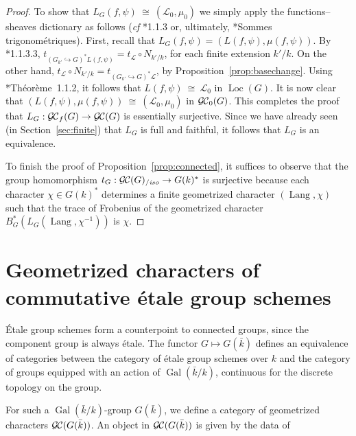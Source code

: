 \documentclass[11pt]{amsart}
\theoremstyle{plain}
\theoremstyle{definition}
\theoremstyle{remark}
\newcommand{\bFq}{\bar{k}}
\newcommand{\Fq}{k}
\DeclareMathOperator{\Gal}{Gal}
\newcommand{\iso}{{\ \cong\ }}
\newcommand{\cs}[1]{{\mathcal{#1}}}
\newcommand{\GC}{{\mathcal{G\hskip-0.8pt C}}}
\newcommand{\GCb}{{\GC_0}}
\newcommand{\GCf}{{\GC_f}}
\newcommand{\GCiso}[1]{\GC(#1)_{/\textit{iso}}}
\newcommand{\Lang}{{\operatorname{Lang}}}
\newcommand{\Loc}{{\operatorname{Loc}}}
\newcommand{\trFrob}[1]{t_{#1}}
\begin{document}
\begin{proof}
  To show that $L_G(f,\psi) \iso (\cs{L}_0,\mu_0)$ we simply apply the functions--sheaves dictionary
  as follows ({\it cf} \cite{Laumon}*{1.1.3} or, ultimately, \cite{SGA4.5}*{Sommes trigonométriques}).
  First, recall that $L_G(f,\psi) = (L(f,\psi), \mu(f,\psi))$. 
  By  \cite{Laumon}*{1.1.3.3}, $\trFrob{(G_{k'}\hookrightarrow G)^*L(f,\psi)} = \trFrob{\cs{L}} \circ N_{k'/k}$, for each finite extension $k'/k$.
  On the other hand, $\trFrob{\cs{L}} \circ N_{k'/k} = \trFrob{(G_{k'}\hookrightarrow G)^*\cs{L}}$,  by Proposition~\ref{prop:basechange}.
  Using \cite{Laumon}*{Th\'eor\`eme~1.1.2}, it follows that  $L(f,\psi) \iso \cs{L}_0$ in $\Loc(G)$.
  It is now clear that $(L(f,\psi),\mu(f,\psi)) \iso (\cs{L}_0,\mu_0)$ in $\GCb(G)$.
  This completes the proof that $L_G : \GCf(G) \to \GC(G)$ is essentially surjective.
  Since we have already seen (in Section~\ref{sec:finite}) that $L_G$ is full and faithful, 
  it follows that $L_G$ is an equivalence.
  
  To finish the proof of Proposition~\ref{prop:connected}, it suffices to observe that the group homomorphism
  $
  \trFrob{G} : \GCiso{G} \to G(\Fq)^*
  $
  is surjective because each character $\chi \in G(\Fq)^*$ determines a finite geometrized character $(\Lang,\chi)$ such that the trace of Frobenius of the geometrized character $B_G^* (L_G(\Lang,\chi^{-1}))$ is $\chi$.
\end{proof}

\section{Geometrized characters of commutative \'etale group schemes}

%

\'Etale group schemes form a counterpoint to connected groups, since the component group
is always \'etale.  The functor $G \mapsto G(\bFq)$ defines an equivalence of categories
between the category of \'etale group schemes over $\Fq$ and the category of groups equipped
with an action of $\Gal(\bFq/\Fq)$, continuous for the discrete topology on the group.

For such a $\Gal(\bFq/\Fq)$-group $G(\bFq)$, we define a category of geometrized characters $\GC(G(\bFq))$.
An object in $\GC(G(\bFq))$ is given by the data of
\end{document}
